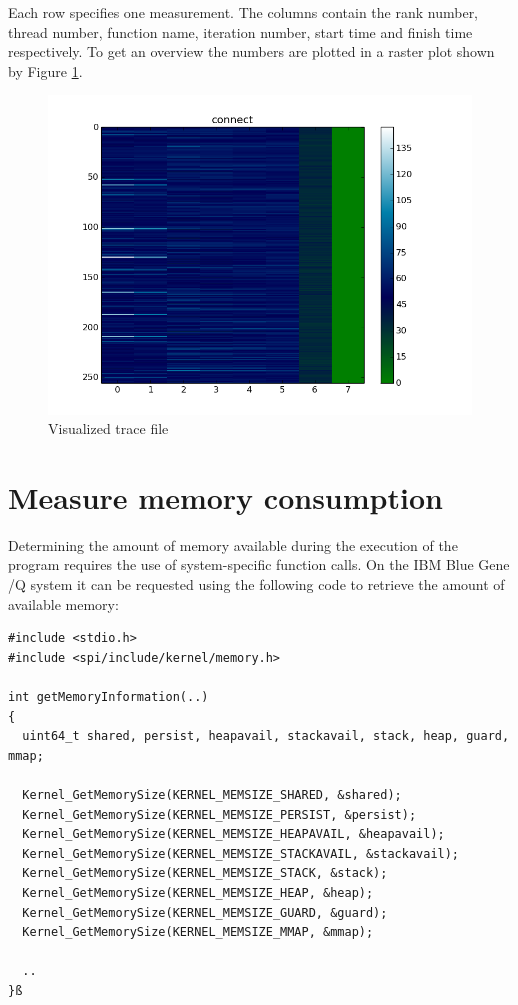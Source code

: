 Each row specifies one measurement. The columns contain the rank number, thread number, function name,
iteration number, start time and finish time respectively.
To get an overview the numbers are plotted in a raster plot shown by Figure \ref{fig:tracefile}.
\begin{figure}[ht!]
\centering
\includegraphics[scale=0.4]{pictures/1per300_tracefile_connect.png}
\caption{Visualized trace file}
\label{fig:tracefile}
\end{figure}

\section{Measure memory consumption}
\label{bgqmemory}
Determining the amount of memory available during the execution of the program requires the use of system-specific function calls. 
On the IBM Blue Gene /Q system it can be requested using the following code to retrieve the amount of available memory:
\begin{lstlisting}
#include <stdio.h>
#include <spi/include/kernel/memory.h>

int getMemoryInformation(..)
{
  uint64_t shared, persist, heapavail, stackavail, stack, heap, guard, mmap;

  Kernel_GetMemorySize(KERNEL_MEMSIZE_SHARED, &shared);
  Kernel_GetMemorySize(KERNEL_MEMSIZE_PERSIST, &persist);
  Kernel_GetMemorySize(KERNEL_MEMSIZE_HEAPAVAIL, &heapavail);
  Kernel_GetMemorySize(KERNEL_MEMSIZE_STACKAVAIL, &stackavail);
  Kernel_GetMemorySize(KERNEL_MEMSIZE_STACK, &stack);
  Kernel_GetMemorySize(KERNEL_MEMSIZE_HEAP, &heap);
  Kernel_GetMemorySize(KERNEL_MEMSIZE_GUARD, &guard);
  Kernel_GetMemorySize(KERNEL_MEMSIZE_MMAP, &mmap);

  ..
}ß

\end{lstlisting}

